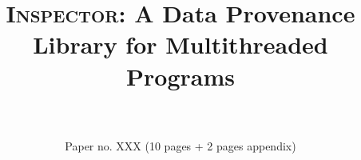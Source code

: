 \documentclass{IEEEtran}
\newcommand{\projecttitle}{\textsc{Inspector}\xspace}
\newcommand{\intelpt}{{Intel\textsuperscript{\textregistered} PT}\xspace}
\begin{document}
\author{
\\
\\
Paper no. XXX (10 pages + 2 pages appendix)
}

\title{\Large \projecttitle: A Data Provenance Library for Multithreaded Programs}%
\maketitle















 
\end{document}
